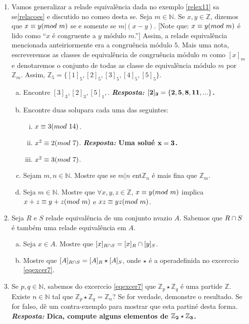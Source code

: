 \begin{enumerate}[{\bf 1.}]
\item Vamos generalizar a rela\cao de equival\^encia dada no exemplo \ref{relex11} sa se\cao \ref{relacoes} e discutido no come\cc o desta se\caoi. Seja $m\in\mathbb{N}$. Se $x,y\in\mathbb{Z}$, dizemos que $x\equiv y(mod \textrm{ } m)$ se e somente se $m|(x-y)$. [Note que: $x\equiv y(mod \textrm{ } m)$ \'e lido como ``$x$ \'e congruente a $y$ m\'odulo $m$.''] Assim, a rela\cao de equival\^encia mencionada anteiriormente era a congru\^encia m\'odulo $5$. Mais uma nota\caoi, escreveremos as classes de equival\^encia de congru\^encia m\'odulo $m$ como $[x]_m$ e denotaremos o conjunto de todas as classe de equival\^encia m\'odulo $m$ por $\mathbb{Z}_m$. Assim, $\mathbb{Z}_5=\{[1]_5,[2]_5,[3]_5,[4]_5,[5]_5\}$.
\begin{enumerate}[a)]
\item Encontre $[3]_3,[2]_3,[5]_1,$. {\bf{\it Resposta:} ${\bf [2]_3=\{2,5,8,11,...\}}$.}
\item Encontre duas solu\coes para cada uma das seguintes:
\begin{enumerate}[i)]
\item $x\equiv 3(mod \textrm{ } 14)$.
\item $x^2\equiv 2(mod \textrm{ } 7)$. {\bf{\it Resposta:} Uma solu\cao \'e ${\bf x=3}$.}
\item $x^2\equiv 3(mod \textrm{ } 7)$.
\end{enumerate}
\item Sejam $m,n\in\mathbb{N}$. Mostre que se $m|n$ ent\ao $\mathbb{Z}_n$ \'e mais fina que $\mathbb{Z}_m$.
\item Seja $m\in\mathbb{N}$. Mostre que $\forall x,y,z\in\mathbb{Z}$, $x\equiv y(mod \textrm{ } m)$ implica $x+z\equiv y+z(mod \textrm{ } m)$ e $xz\equiv yz(mod \textrm{ } m)$.
\end{enumerate}

\item Seja $R$ e $S$ rela\coes de equival\^encia de um conjunto n\ao vazio $A$. Sabemos que $R\cap S$ \'e tamb\'em uma rela\cao de equival\^encia em $A$.
\begin{enumerate}[a)]
\item Seja $x\in A$. Mostre que $[x]_{R\cap S}=[x]_R\cap[y]_S$. 
\item Mostre que $[A]_{R\cap S}=[A]_R\star[A]_S$, onde $\star$ \'e a opera\cao definida no excerc\ih cio \ref{eqexcer7}.
\end{enumerate}

\item Se $p,q\in\mathbb{N}$, sabemos do excerc\ih cio \ref{eqexcer7} que $\mathbb{Z}_p\star\mathbb{Z}_q$ \'e uma parti\cao de $\mathbb{Z}$.  Existe $n\in\mathbb{N}$ tal que $\mathbb{Z}_p\star\mathbb{Z}_q=\mathbb{Z}_n$? Se for verdade, demonstre o resultado. Se for falso, d\^e um contra-exemplo para mostrar que esta parti\cao n\ao \'e desta forma.
{\bf{\it Resposta:} Dica, compute alguns elementos de ${\bf \mathbb{Z}_2\star\mathbb{Z}_3}$.}


\end{enumerate}
